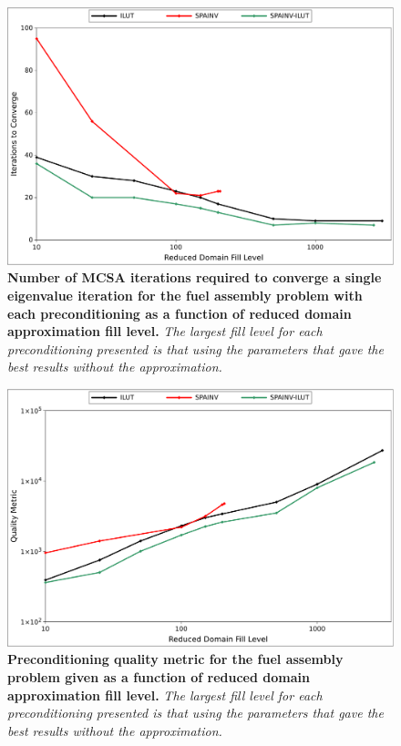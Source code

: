 \begin{figure}[t!]
  \begin{center}
    \includegraphics[width=6in]{chapters/spn_equations/rda_iterations.pdf}
  \end{center}
  \caption{\textbf{Number of MCSA iterations required to converge a
      single eigenvalue iteration for the fuel assembly problem with
      each preconditioning as a function of reduced domain
      approximation fill level.} \textit{The largest fill level for
      each preconditioning presented is that using the parameters that
      gave the best results without the approximation.}}
  \label{fig:rda_iterations}
\end{figure}

\begin{figure}[t!]
  \begin{center}
    \includegraphics[width=6in]{chapters/spn_equations/rda_quality.pdf}
  \end{center}
  \caption{\textbf{Preconditioning quality metric for the fuel
      assembly problem given as a function of reduced domain
      approximation fill level.} \textit{The largest fill level for
      each preconditioning presented is that using the parameters that
      gave the best results without the approximation.}}
  \label{fig:rda_quality}
\end{figure}

